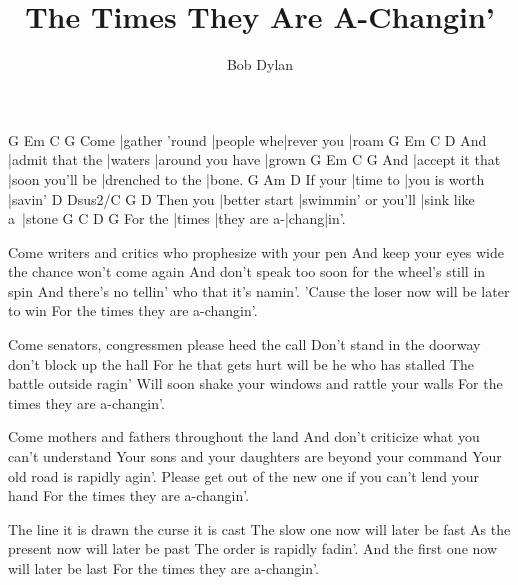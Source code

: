 \documentclass{song}
\title{The Times They Are A-Changin'}
\author{Bob Dylan}
\begin{document}
\strophe
     G              Em         C          G
Come |gather 'round |people whe|rever you |roam
    G               Em      C                D
And |admit that the |waters |around you have |grown
    G               Em              C                G
And |accept it that |soon you'll be |drenched to the |bone.
        G        Am            D
If your |time to |you is worth |savin'
         D             Dsus2/C             G            D
Then you |better start |swimmin' or you'll |sink like a~|stone
        G      C           D     G
For the |times |they are a-|chang|in'.
\endstrophe

\strophe*
Come writers and critics who prophesize with your pen
And keep your eyes wide the chance won't come again
And don't speak too soon for the wheel's still in spin
And there's no tellin' who that it's namin'.
'Cause the loser now will be later to win
For the times they are a-changin'.
\endstrophe

\strophe*
Come senators, congressmen please heed the call
Don't stand in the doorway don't block up the hall
For he that gets hurt will be he who has stalled
The battle outside ragin'
Will soon shake your windows and rattle your walls
For the times they are a-changin'.
\endstrophe

\strophe*
Come mothers and fathers throughout the land
And don't criticize what you can't understand
Your sons and your daughters are beyond your command
Your old road is rapidly agin'.
Please get out of the new one if you can't lend your hand
For the times they are a-changin'.
\endstrophe

\strophe*
The line it is drawn the curse it is cast
The slow one now will later be fast
As the present now will later be past
The order is rapidly fadin'.
And the first one now will later be last
For the times they are a-changin'.
\endstrophe

\end{document}
